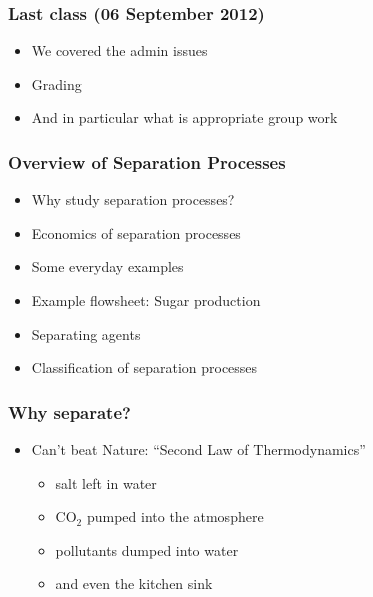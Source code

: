 
\begin{frame}\frametitle{Last class (06 September 2012)}
	\begin{itemize}
		\item	We covered the admin issues
		\item	Grading
		\item	And in particular what is appropriate group work
	\end{itemize}
\end{frame}

\begin{frame}\frametitle{Overview of Separation Processes}
	
	\begin{itemize}
		\item	Why study separation processes?
		\item	Economics of separation processes
		\item	Some everyday examples
		\item	Example flowsheet: Sugar production
		\item	Separating agents
		\item	Classification of separation processes		
	\end{itemize}
\end{frame}

\begin{frame}\frametitle{Why separate?}
	\begin{itemize}
		\item	Can't beat Nature: ``Second Law of Thermodynamics''
			\begin{itemize}
				\item	salt left in water
				\item	$\text{CO}_2$ pumped into the atmosphere
				\item	pollutants dumped into water
				\item	and even the kitchen sink
			\end{itemize}
	\end{itemize}
\end{frame}


